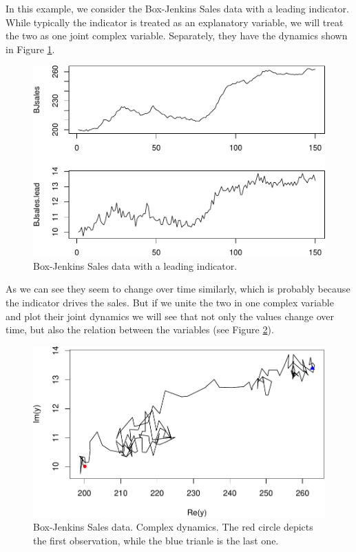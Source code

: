 \documentclass[
]{book}
\begin{document}
In this example, we consider the Box-Jenkins Sales data with a leading indicator. While typically the indicator is treated as an explanatory variable, we will treat the two as one joint complex variable. Separately, they have the dynamics shown in Figure \ref{fig:BJSales}.

\begin{figure}
\centering
\includegraphics{Svetunkov---Svetunkov---Complex-Valued-Econometrics_files/figure-latex/BJSales-1.pdf}
\caption{\label{fig:BJSales}Box-Jenkins Sales data with a leading indicator.}
\end{figure}

As we can see they seem to change over time similarly, which is probably because the indicator drives the sales. But if we unite the two in one complex variable and plot their joint dynamics we will see that not only the values change over time, but also the relation between the variables (see Figure \ref{fig:BJSalesComplex}).

\begin{figure}
\centering
\includegraphics{Svetunkov---Svetunkov---Complex-Valued-Econometrics_files/figure-latex/BJSalesComplex-1.pdf}
\caption{\label{fig:BJSalesComplex}Box-Jenkins Sales data. Complex dynamics. The red circle depicts the first observation, while the blue trianle is the last one.}
\end{figure}
\end{document}
